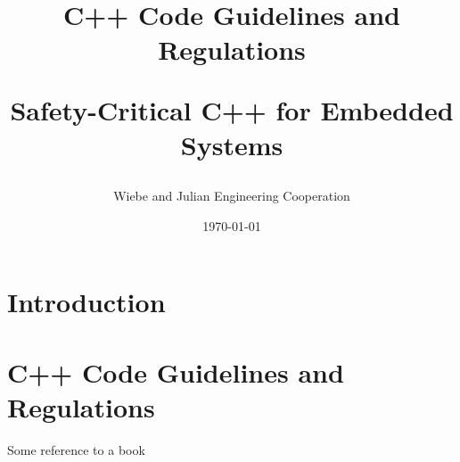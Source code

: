 \documentclass[11pt]{article}
\title{
      C++ Code Guidelines and Regulations \\
      \begin{large}
         Safety-Critical C++ for Embedded Systems
      \end{large}
}
\date{\today}
\author{Wiebe and Julian Engineering Cooperation}
\begin{document}
\maketitle

\newpage
{} %
\tableofcontents
\newpage
{} %

\newpage
\section{Introduction}

\section{C++ Code Guidelines and Regulations}
Some reference to a book \cite{DUMMY:1}

\newpage
\printbibliography

\newpage
\begin{appendix}
\end{appendix}
\end{document}
